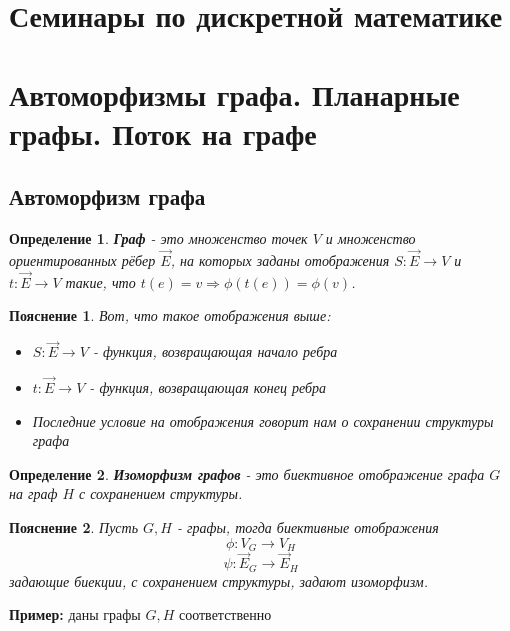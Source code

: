 \documentclass{article}
\newtheorem{definition}{Определение}
\newtheorem*{explanation*}{Пояснение}
\begin{document}
\section*{Семинары по дискретной математике}
\section{Автоморфизмы графа. Планарные графы. Поток на графе}
\subsection{Автоморфизм графа}
\begin{definition}
    \textbf{Граф} - это множенство точек $V$ и множенство ориентированных
     рёбер $\overrightarrow{E}$,
    на которых заданы отображения $S:\overrightarrow{E} \rightarrow V$ и $t:\overrightarrow{E} \rightarrow V$ такие,
    что $t(e)=v \Rightarrow \phi(t(e)) = \phi(v)$.
\end{definition}
\begin{explanation*}
    Вот, что такое отображения выше:
    \begin{itemize}
        \item $S:\overrightarrow{E} \rightarrow V$ - функция, возвращающая
        начало ребра
        \item$t:\overrightarrow{E} \rightarrow V$ - функция, возвращающая конец ребра
        \item Последние условие на отображения говорит нам о сохранении структуры графа
    \end{itemize}
\end{explanation*}

\begin{definition}
    \textbf{Изоморфизм графов} - это биективное отображение графа $G$ на граф $H$ с сохранением
    структуры.
\end{definition}
\begin{explanation*}
    Пусть $G, H$ - графы, тогда биективные отображения
        $$\phi : V_{G} \rightarrow V_{H}$$
        $$\psi : \overrightarrow{E}_{G} \rightarrow \overrightarrow{E}_{H}$$
задающие биекции, с сохранением структуры, задают изоморфизм.
\end{explanation*}
\textbf{Пример:} даны графы $G, H$ соответственно
\end{document}

